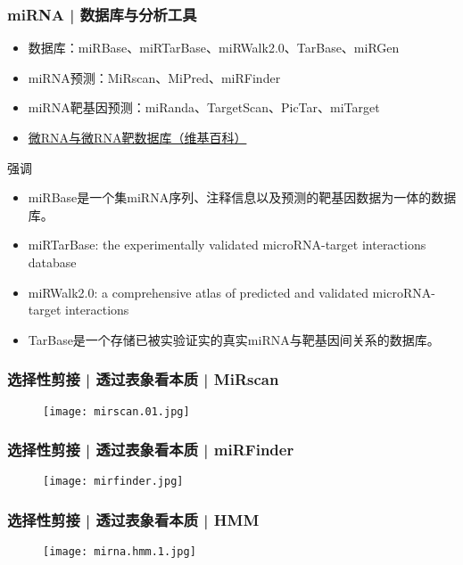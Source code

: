 \begin{frame}
  \frametitle{miRNA | 数据库与分析工具}
  \begin{itemize}
    \item 数据库：miRBase、miRTarBase、miRWalk2.0、TarBase、miRGen
    \item miRNA预测：MiRscan、MiPred、miRFinder
    \item miRNA靶基因预测：miRanda、TargetScan、PicTar、miTarget
    \item \href{http://zh.wikipedia.org/wiki/\%E5\%BE\%AERNA\%E4\%B8\%8E\%E5\%BE\%AERNA\%E9\%9D\%B6\%E6\%95\%B0\%E6\%8D\%AE\%E5\%BA\%93}{微RNA与微RNA靶数据库（维基百科）}
  \end{itemize}
  \pause
  \begin{block}{强调}
    \begin{itemize}
      \item miRBase是一个集miRNA序列、注释信息以及预测的靶基因数据为一体的数据库。
      \item miRTarBase: the experimentally validated microRNA-target interactions database
      \item miRWalk2.0: a comprehensive atlas of predicted and validated microRNA-target interactions
      \item TarBase是一个存储已被实验证实的真实miRNA与靶基因间关系的数据库。
    \end{itemize}
  \end{block}
\end{frame}

\begin{frame}
  \frametitle{选择性剪接 | 透过表象看本质 | MiRscan}
  \begin{figure}
    \centering
    \texttt{[image: mirscan.01.jpg]}
  \end{figure}
\end{frame}

\begin{frame}
  \frametitle{选择性剪接 | 透过表象看本质 | miRFinder}
  \begin{figure}
    \centering
    \texttt{[image: mirfinder.jpg]}
  \end{figure}
\end{frame}

\begin{frame}
  \frametitle{选择性剪接 | 透过表象看本质 | HMM}
  \begin{figure}
    \centering
    \texttt{[image: mirna.hmm.1.jpg]}
  \end{figure}
\end{frame}


